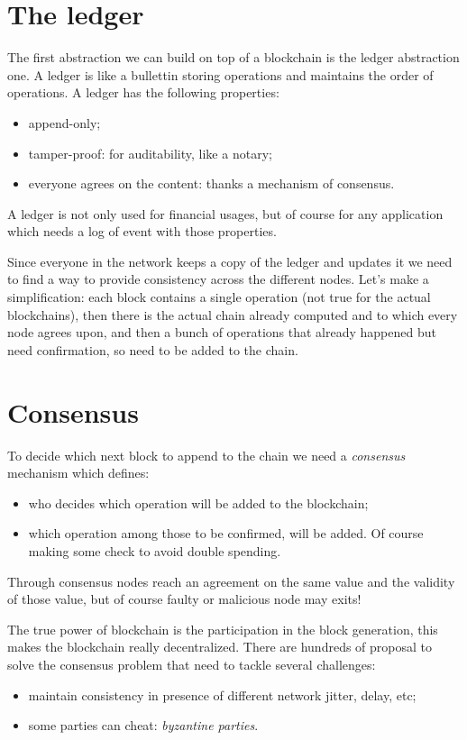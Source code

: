 \section{The ledger}
The first abstraction we can build on top of a blockchain is the ledger abstraction one.
A ledger is like a bullettin storing operations and maintains the order of operations.
A ledger has the following properties:
\begin{itemize}
    \item append-only;
    \item tamper-proof: for auditability, like a notary;
    \item everyone agrees on the content: thanks a mechanism of consensus.
\end{itemize}
A ledger is not only used for financial usages, but of course for any application which needs a log of event with those properties.

Since everyone in the network keeps a copy of the ledger and updates it we need to find a way to provide consistency across the different nodes.
Let's make a simplification: each block contains a single operation (not true for the actual blockchains), then there is the actual chain already computed and to which every node agrees upon, and then a bunch of operations that already happened but need confirmation, so need to be added to the chain.

\section{Consensus}
To decide which next block to append to the chain we need a \emph{consensus} mechanism which defines:
\begin{itemize}
    \item who decides which operation will be added to the blockchain;
    \item which operation among those to be confirmed, will be added.
    Of course making some check to avoid double spending.
\end{itemize}
Through consensus nodes reach an agreement on the same value and the validity of those value, but of course faulty or malicious node may exits!

The true power of blockchain is the participation in the block generation, this makes the blockchain really decentralized.
There are hundreds of proposal to solve the consensus problem that need to tackle several challenges:
\begin{itemize}
    \item maintain consistency in presence of different network jitter, delay, etc;
    \item some parties can cheat: \emph{byzantine parties}.
\end{itemize}

